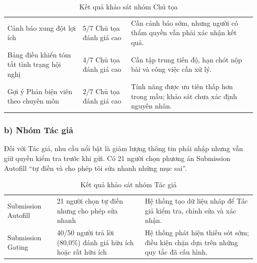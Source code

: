 \begin{table}[H]
\caption{Kết quả khảo sát nhóm Chủ tọa}
\label{tab:ch2-chair-priorities}
\centering
\setlength{\tabcolsep}{2pt}
\renewcommand{\arraystretch}{1.15}
\begin{tabular}{|P{0.25\textwidth}|P{0.25\textwidth}|P{0.45\textwidth}|}
\hline
{} &  &  \\ \hline
Cảnh báo xung đột lợi ích & 5/7 Chủ tọa đánh giá cao & Cần cảnh báo sớm, nhưng người có thẩm quyền vẫn phải xác nhận kết quả. \\ \hline
Bảng điều khiển tóm tắt tình trạng hội nghị & 4/7 Chủ tọa đánh giá cao & Cần tập trung tiến độ, hạn chót nộp bài và công việc cần xử lý. \\ \hline
Gợi ý Phản biện viên theo chuyên môn & 2/7 Chủ tọa đánh giá cao & Tính năng được ưu tiên thấp hơn trong mẫu; khảo sát chưa xác định nguyên nhân. \\ \hline
\end{tabular}
\end{table}

\subsubsection{b) Nhóm Tác giả}

Đối với Tác giả, nhu cầu nổi bật là giảm lượng thông tin phải nhập nhưng vẫn giữ quyền kiểm tra trước khi gửi. Có 21 người chọn phương án Submission Autofill ``tự điền và cho phép tôi sửa nhanh những mục sai''.

\begin{table}[H]
\caption{Kết quả khảo sát nhóm Tác giả}
\label{tab:ch2-author-preferences}
\centering
\setlength{\tabcolsep}{2pt}
\renewcommand{\arraystretch}{1.15}
\begin{tabular}{|P{0.27\textwidth}|P{0.31\textwidth}|P{0.35\textwidth}|}
\hline
{} &  &  \\ \hline
Submission Autofill & 21 người chọn tự điền nhưng cho phép sửa nhanh & Hệ thống tạo dữ liệu nháp để Tác giả kiểm tra, chỉnh sửa và xác nhận. \\ \hline
Submission Gating & 40/50 người trả lời (80,0\%) đánh giá hữu ích hoặc rất hữu ích & Hệ thống phát hiện thiếu sót sớm; điều kiện chặn dựa trên những quy tắc đã cấu hình. \\ \hline
\end{tabular}
\end{table}

